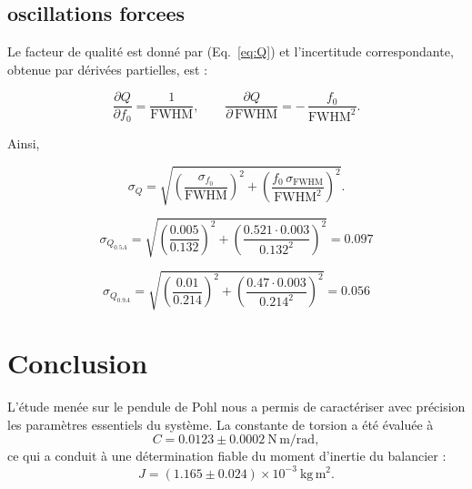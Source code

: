 \subsection{oscillations forcees}

Le facteur de qualité est donné par (Eq.~\ref{eq:Q}) et l’incertitude correspondante, obtenue par dérivées partielles, est :

\[
\frac{\partial Q}{\partial f_0} = \frac{1}{\mathrm{FWHM}},
\qquad
\frac{\partial Q}{\partial\,\mathrm{FWHM}}
= -\,\frac{f_0}{\mathrm{FWHM}^2}.
\]

Ainsi,

\[
\sigma_Q
=
\sqrt{
\left(\frac{\sigma_{f_0}}{\mathrm{FWHM}}\right)^2
+
\left(
\frac{f_0\,\sigma_{\mathrm{FWHM}}}{\mathrm{FWHM}^2}
\right)^2
}.
\]

\[
\sigma_{Q_{0.5A}}
=
\sqrt{
\left(\frac{0.005}{0.132}\right)^2
+
\left(\frac{0.521 \cdot 0.003}{0.132^2}\right)^2
}
= 0.097
\]

\[
\sigma_{Q_{0.9A}}
=
\sqrt{
\left(\frac{0.01}{0.214}\right)^2
+
\left(\frac{0.47 \cdot 0.003}{0.214^2}\right)^2
}
= 0.056
\]


\section{Conclusion}


L’étude menée sur le pendule de Pohl nous a permis de caractériser avec précision les paramètres essentiels du système. 
La constante de torsion a été évaluée à 
\[
C = 0.0123 \pm 0.0002~\mathrm{N\,m/rad},
\]
ce qui a conduit à une détermination fiable du moment d’inertie du balancier :
\[
J = (1.165 \pm 0.024)\times 10^{-3}~\mathrm{kg\,m^2}.
\]

